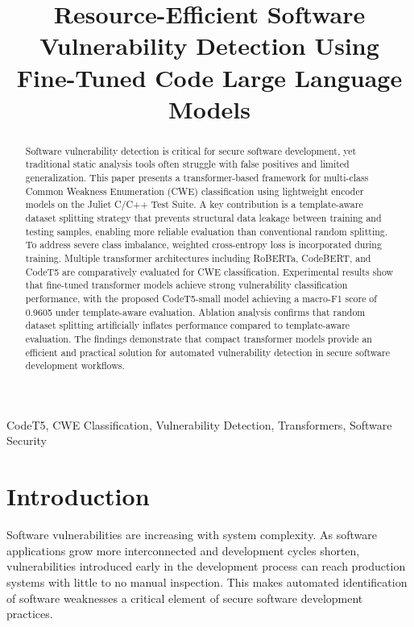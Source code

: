 \documentclass[conference]{IEEEtran}
\title{Resource-Efficient Software Vulnerability Detection
Using Fine-Tuned Code Large Language Models }
\author{
\IEEEauthorblockN{Rohan, Sariga Saji, Vaasanth, Gopakumar.G, M.S Basanth}
\IEEEauthorblockA{
Department of Computer Science and Engineering (AI)\\
Amrita Vishwa Vidyapeetham,Amritapuri,India\\
}
}
\begin{document}
\maketitle

\begin{abstract}
Software vulnerability detection is critical for secure software development, yet traditional static analysis tools often struggle with false positives and limited generalization. This paper presents a transformer-based framework for multi-class Common Weakness Enumeration (CWE) classification using lightweight encoder models on the Juliet C/C++ Test Suite. A key contribution is a template-aware dataset splitting strategy that prevents structural data leakage between training and testing samples, enabling more reliable evaluation than conventional random splitting. To address severe class imbalance, weighted cross-entropy loss is incorporated during training. Multiple transformer architectures including RoBERTa, CodeBERT, and CodeT5 are comparatively evaluated for CWE classification. Experimental results show that fine-tuned transformer models achieve strong vulnerability classification performance, with the proposed CodeT5-small model achieving a macro-F1 score of 0.9605 under template-aware evaluation. Ablation analysis confirms that random dataset splitting artificially inflates performance compared to template-aware evaluation. The findings demonstrate that compact transformer models provide an efficient and practical solution for automated vulnerability detection in secure software development workflows.
\end{abstract}

\begin{IEEEkeywords}
CodeT5, CWE Classification, Vulnerability Detection, Transformers, Software Security
\end{IEEEkeywords}

\section{Introduction}

Software vulnerabilities are increasing with system complexity. As software applications grow more interconnected and development cycles shorten, vulnerabilities introduced early in the development process can reach production systems with little to no manual inspection. This makes automated identification of software weaknesses a critical element of secure software development practices.
\end{document}
